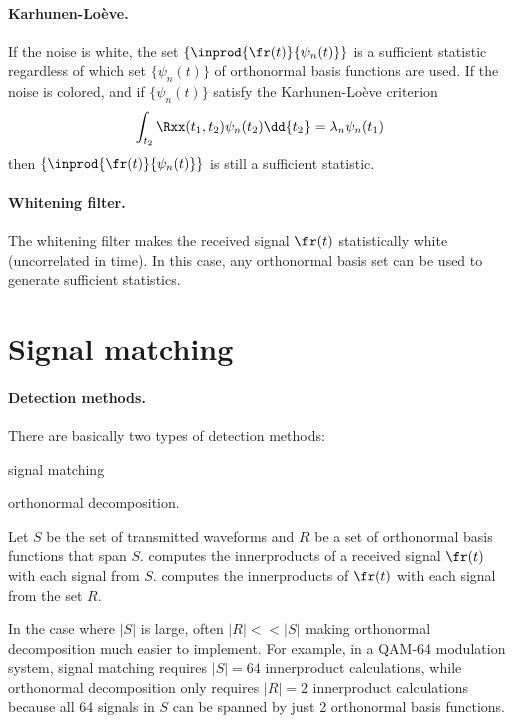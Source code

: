 \paragraph{Karhunen-Lo\`{e}ve.}
If the noise is white, the set $\{\inprod{\fr(t)}{\psi_n(t)}\}$
is a sufficient statistic regardless of which
set $\{\psi_n(t)\}$ of orthonormal basis functions are used.
If the noise is colored, and if $\{\psi_n(t)\}$ satisfy the
Karhunen-Lo\`{e}ve criterion
   \[ \int_{t_2}\Rxx(t_1,t_2)\psi_n(t_2)\dd{t_2} = \lambda_n \psi_n(t_1) \]
then $\{\inprod{\fr(t)}{\psi_n(t)}\}$ is still a sufficient statistic.

\paragraph{Whitening filter.}
The whitening filter makes the received signal $\fr(t)$ statistically white
(uncorrelated in time). In this case,
any orthonormal basis set can be used to generate sufficient statistics.




\section{Signal matching}
\paragraph{Detection methods.}
There are basically two types of detection methods:
\begin{enume}
   \item signal matching
   \item orthonormal decomposition.
\end{enume}

Let $S$ be the set of transmitted waveforms and
$R$ be a set of orthonormal basis functions that span $S$.
 computes the innerproducts of a
received signal $\fr(t)$ with each signal from $S$.
 computes the innerproducts of
$\fr(t)$ with each signal from the set $R$.

In the case where $|S|$ is large, often $|R|<<|S|$
making orthonormal decomposition much easier to implement.
For example, in a QAM-64 modulation system,
signal matching requires $|S|=64$ innerproduct calculations,
while orthonormal decomposition only requires $|R|=2$
innerproduct calculations because all 64 signals in $S$ can be spanned
by just 2 orthonormal basis functions.

